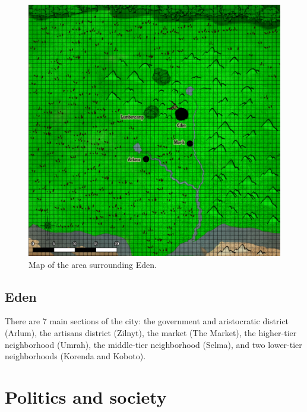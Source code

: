 \documentclass[letterpaper,12pt]{article}
\begin{document}
\begin{figure}[h] 
        \centering \includegraphics[scale=0.31]{edenAreaMap01.png}
        \caption{Map of the area surrounding Eden.}
\end{figure}

\subsection{Eden}

There are 7 main sections of the city: the government and aristocratic district (Arlum), the artisans district (Zilnyt), the market (The Market), the higher-tier neighborhood (Umrah), the middle-tier neighborhood (Selma), and two lower-tier neighborhoods (Korenda and Koboto).

\section{Politics and society}\label{Politics}
\end{document}
